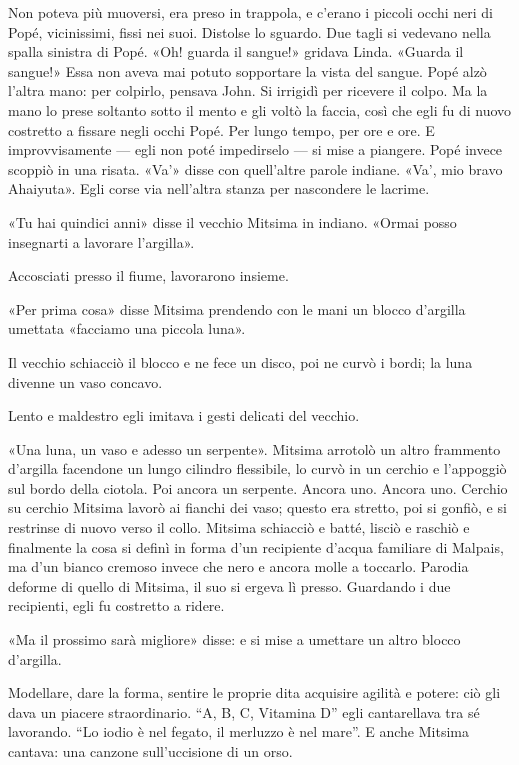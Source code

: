 \documentclass[
a5paper, %
10pt, %
twoside, 
onecolumn, %
openany, %
]{memoir}
\begin{document}
Non poteva più muoversi, era preso in trappola, e c’erano i piccoli occhi neri di Popé, vicinissimi, fissi nei suoi. Distolse lo sguardo. Due tagli si vedevano nella spalla sinistra di Popé. «Oh! guarda il sangue!» gridava Linda. «Guarda il sangue!» Essa non aveva mai potuto sopportare la vista del sangue. Popé alzò l’altra mano: per colpirlo, pensava John. Si irrigidì per ricevere il colpo. Ma la mano lo prese soltanto sotto il mento e gli voltò la faccia, così che egli fu di nuovo costretto a fissare negli occhi Popé. Per lungo tempo, per ore e ore. E improvvisamente — egli non poté impedirselo — si mise a piangere. Popé invece scoppiò in una risata. «Va’» disse con quell’altre parole indiane. «Va’, mio bravo Ahaiyuta». Egli corse via nell’altra stanza per nascondere le lacrime.

«Tu hai quindici anni» disse il vecchio Mitsima in indiano. «Ormai posso insegnarti a lavorare l’argilla».

Accosciati presso il fiume, lavorarono insieme.

«Per prima cosa» disse Mitsima prendendo con le mani un blocco d’argilla umettata «facciamo una piccola luna».

Il vecchio schiacciò il blocco e ne fece un disco, poi ne curvò i bordi; la luna divenne un vaso concavo.

Lento e maldestro egli imitava i gesti delicati del vecchio.

«Una luna, un vaso e adesso un serpente». Mitsima arrotolò un altro frammento d’argilla facendone un lungo cilindro flessibile, lo curvò in un cerchio e l’appoggiò sul bordo della ciotola. Poi ancora un serpente. Ancora uno. Ancora uno. Cerchio su cerchio Mitsima lavorò ai fianchi dei vaso; questo era stretto, poi si gonfiò, e si restrinse di nuovo verso il collo. Mitsima schiacciò e batté, lisciò e raschiò e finalmente la cosa si definì in forma d’un recipiente d’acqua familiare di Malpais, ma d’un bianco cremoso invece che nero e ancora molle a toccarlo. Parodia deforme di quello di Mitsima, il suo si ergeva lì presso. Guardando i due recipienti, egli fu costretto a ridere.

«Ma il prossimo sarà migliore» disse: e si mise a umettare un altro blocco d’argilla.

Modellare, dare la forma, sentire le proprie dita acquisire agilità e potere: ciò gli dava un piacere straordinario. “A, B, C, Vitamina D” egli cantarellava tra sé lavorando. “Lo iodio è nel fegato, il merluzzo è nel mare”. E anche Mitsima cantava: una canzone sull’uccisione di un orso.
\end{document}

